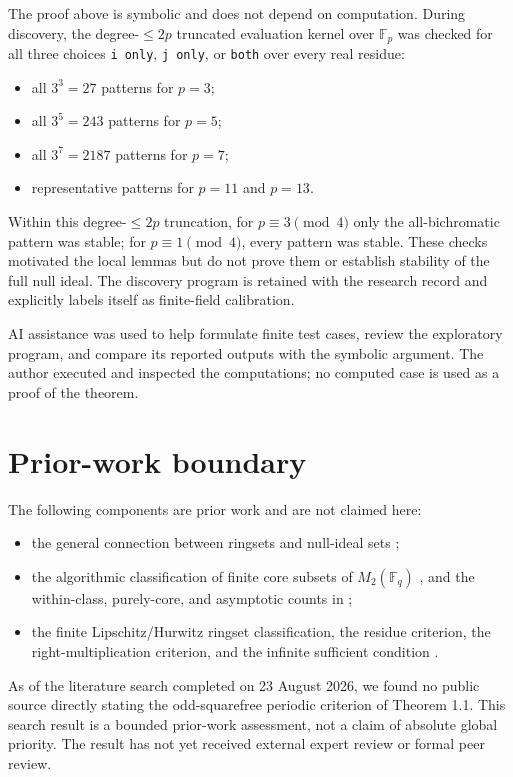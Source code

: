 \documentclass[11pt]{article}
\theoremstyle{remark}
\numberwithin{equation}{section}
\begin{document}
The proof above is symbolic and does not depend on computation. During
discovery, the degree-$\le2p$ truncated evaluation kernel over $\mathbb F_p$
was checked for all three choices \texttt{i only}, \texttt{j only}, or \texttt{both} over every
real residue:

\begin{itemize}
\item all $3^3=27$ patterns for $p=3$;
\item all $3^5=243$ patterns for $p=5$;
\item all $3^7=2187$ patterns for $p=7$;
\item representative patterns for $p=11$ and $p=13$.

\end{itemize}
Within this degree-$\le2p$ truncation, for $p\equiv3\pmod4$ only the
all-bichromatic pattern was stable; for $p\equiv1\pmod4$, every pattern was
stable. These checks motivated the local lemmas but do not prove them or
establish stability of the full null ideal. The discovery program is retained
with the research record and explicitly labels itself as finite-field
calibration.

AI assistance was used to help formulate finite test cases, review the
exploratory program, and compare its reported outputs with the symbolic
argument. The author executed and inspected the computations; no computed
case is used as a proof of the theorem.

\section{Prior-work boundary}

The following components are prior work and are not claimed here:

\begin{itemize}
\item the general connection between ringsets and null-ideal sets \cite{frisch2018};
\item the algorithmic classification of finite core subsets of
$M_2(\mathbb F_q)$ \cite{werner2022}, and the within-class, purely-core, and asymptotic
counts in \cite{rissnerwerner};
\item the finite Lipschitz/Hurwitz ringset classification, the residue criterion,
the right-multiplication criterion, and the infinite sufficient condition
\cite{werner2026}.

\end{itemize}
As of the literature search completed on 23 August 2026, we found no public
source directly stating the odd-squarefree periodic criterion of Theorem 1.1.
This search result is a bounded prior-work assessment, not a claim of absolute
global priority. The result has not yet received external expert review or
formal peer review.
\end{document}
